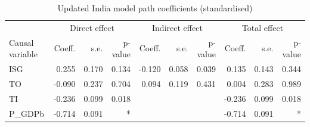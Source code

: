 \documentclass[11pt,a4paper]{article}
\begin{document}
\begin{table}[htbp]
\centering
\begin{adjustbox}{max width=\textwidth}
\begin{tabular}{l|rrr|rrr|rrr}
\toprule
 				& \multicolumn{3}{c|}{Direct effect}  & \multicolumn{3}{c|}{Indirect effect} & \multicolumn{3}{c}{Total effect} \\
Causal variable & Coeff. & s.e. & p-value & Coeff. & s.e. & p-value & Coeff. & s.e. & p-value \\
\midrule
            ISG &     0.255 &   0.170 &      0.134 &    -0.120 &   0.058 &      0.039 &     0.135 &   0.143 &      0.344 \\
             TO &    -0.090 &   0.237 &      0.704 &     0.094 &   0.119 &      0.431 &     0.004 &   0.283 &      0.989 \\
             TI &    -0.236 &   0.099 &      0.018 &           &         &            &    -0.236 &   0.099 &      0.018 \\
        P\_GDPb &    -0.714 &   0.091 &          * &           &         &            &    -0.714 &   0.091 &          * \\
\bottomrule
\end{tabular}
\end{adjustbox}
\caption{Updated India model path coefficients (standardised)}
\label{tab:ind_path_coeff}
\end{table}
\end{document}
